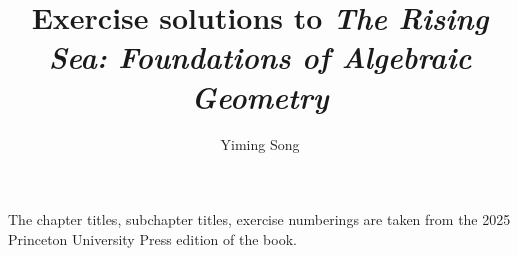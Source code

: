 \documentclass{amsart}
\title{Exercise solutions to \emph{The Rising Sea: Foundations of Algebraic Geometry}}
\author{Yiming Song}
\begin{document}
\maketitle
The chapter titles, subchapter titles, exercise numberings are taken from the 2025 Princeton University Press edition of the book.
\tableofcontents



\end{document}
